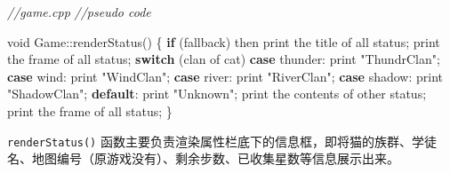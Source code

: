 \documentclass[hyperref,UTF8,a4paper]{ctexart}
\newenvironment{Shaded}{}{}
\newcommand{\CommentTok}[1]{\textcolor[rgb]{0.38,0.63,0.69}{\textit{#1}}}
\newcommand{\ControlFlowTok}[1]{\textcolor[rgb]{0.00,0.44,0.13}{\textbf{#1}}}
\newcommand{\DataTypeTok}[1]{\textcolor[rgb]{0.56,0.13,0.00}{#1}}
\newcommand{\NormalTok}[1]{#1}
\newcommand{\StringTok}[1]{\textcolor[rgb]{0.25,0.44,0.63}{#1}}
\begin{document}
\begin{Shaded}
\begin{Highlighting}[]
\CommentTok{//game.cpp}
\CommentTok{//pseudo code}

\DataTypeTok{void}\NormalTok{ Game::renderStatus()}
\NormalTok{\{}
    \ControlFlowTok{if}\NormalTok{ (fallback) then}
\NormalTok{        print the title of all status;}
\NormalTok{        print the frame of all status;}
    \ControlFlowTok{switch}\NormalTok{ (clan of cat)}
        \ControlFlowTok{case}\NormalTok{ thunder: print }\StringTok{"ThundrClan"}\NormalTok{;}
        \ControlFlowTok{case}\NormalTok{ wind: print }\StringTok{"WindClan"}\NormalTok{;}
        \ControlFlowTok{case}\NormalTok{ river: print }\StringTok{"RiverClan"}\NormalTok{;}
        \ControlFlowTok{case}\NormalTok{ shadow: print }\StringTok{"ShadowClan"}\NormalTok{;}
        \ControlFlowTok{default}\NormalTok{: print }\StringTok{"Unknown"}\NormalTok{;}
\NormalTok{    print the contents of other status;}
\NormalTok{    print the frame of all status;}
\NormalTok{\}}
\end{Highlighting}
\end{Shaded}

\texttt{renderStatus()}
函数主要负责渲染属性栏底下的信息框，即将猫的族群、学徒名、地图编号（原游戏没有）、剩余步数、已收集星数等信息展示出来。
\end{document}
